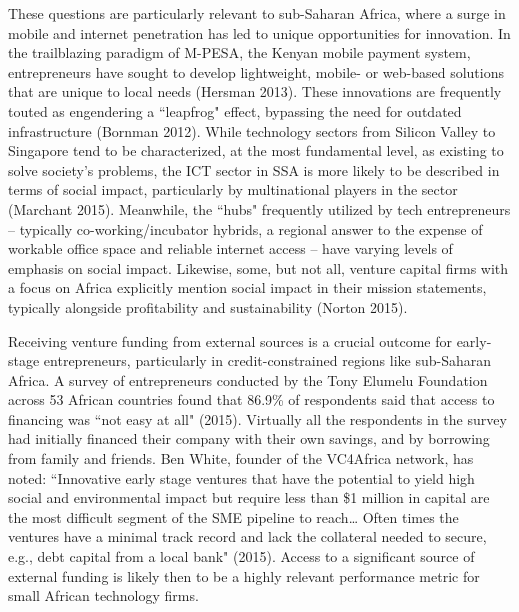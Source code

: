 \documentclass[12pt]{article}
\begin{document}
These questions are particularly relevant to sub-Saharan Africa, where a surge in mobile and internet penetration has led to unique opportunities for innovation. In the trailblazing paradigm of M-PESA, the Kenyan mobile payment system, entrepreneurs have sought to develop lightweight, mobile- or web-based solutions that are unique to local needs (Hersman 2013). These innovations are frequently touted as engendering a ``leapfrog" effect, bypassing the need for outdated infrastructure (Bornman 2012). While technology sectors from Silicon Valley to Singapore tend to be characterized, at the most fundamental level, as existing to solve society's problems, the ICT sector in SSA is more likely to be described in terms of social impact, particularly by multinational players in the sector (Marchant 2015). Meanwhile, the ``hubs" frequently utilized by tech entrepreneurs -- typically co-working/incubator hybrids, a regional answer to the expense of workable office space and reliable internet access -- have varying levels of emphasis on social impact. Likewise, some, but not all, venture capital firms with a focus on Africa explicitly mention social impact in their mission statements, typically alongside profitability and sustainability (Norton 2015).

Receiving venture funding from external sources is a crucial outcome for early-stage entrepreneurs, particularly in credit-constrained regions like sub-Saharan Africa. A survey of entrepreneurs conducted by the Tony Elumelu Foundation across 53 African countries found that 86.9\% of respondents said that access to financing was ``not easy at all" (2015). Virtually all the respondents in the survey had initially financed their company with their own savings, and by borrowing from family and friends. Ben White, founder of the VC4Africa network, has noted: ``Innovative early stage ventures that have the potential to yield high social and environmental impact but require less than \$1 million in capital are the most difficult segment of the SME pipeline to reach… Often times the ventures have a minimal track record and lack the collateral needed to secure, e.g., debt capital from a local bank" (2015). Access to a significant source of external funding is likely then to be a highly relevant performance metric for small African technology firms. 
\end{document}
